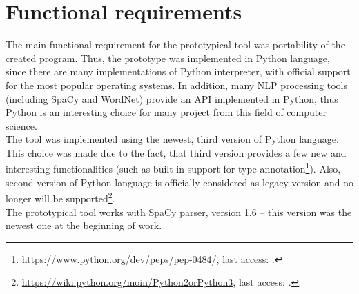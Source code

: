 \section{Functional requirements}
The main functional requirement for the prototypical tool was portability of the created program. Thus, the prototype was implemented in Python language, since there are many implementations of Python interpreter, with official support for the most popular operating systems. In addition, many NLP processing tools (including SpaCy and WordNet) provide an API implemented in Python, thus Python is an interesting choice for many project from this field of computer science.\\
The tool was implemented using the newest, third version of Python language. This choice was made due to the fact, that third version provides a few new and interesting functionalities (such as built-in support for type annotation\footnote{\url{https://www.python.org/dev/peps/pep-0484/}, last access: \onlineAccess.}). Also, second version of Python language is officially considered as legacy version and no longer will be supported\footnote{\url{https://wiki.python.org/moin/Python2orPython3}, last access: \onlineAccess.}.\\
The prototypical tool works with SpaCy parser, version 1.6 -- this version was the newest one at the beginning of work.

